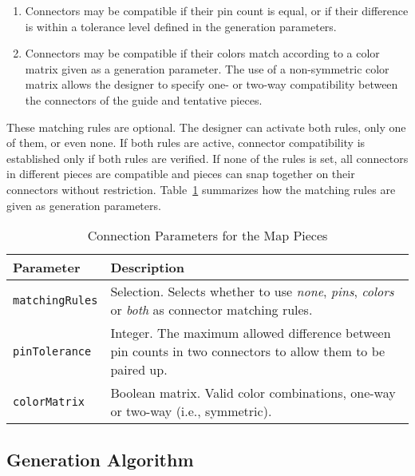 \documentclass[journal]{IEEEtran}
\begin{document}
\begin{enumerate}
    \item Connectors may be compatible if their pin count is equal, or if their
        difference is within a tolerance level defined in the generation parameters.
    \item Connectors may be compatible if their colors match according to a color
        matrix given as a generation parameter. The use of a non-symmetric
        color matrix allows the designer to specify one- or two-way compatibility
        between the connectors of the guide and tentative pieces.
\end{enumerate}

These matching rules are optional. The designer can activate both rules, only
one of them, or even none. If both rules are active, connector compatibility is
established only if both rules are verified. If none of the rules is set, all
connectors in different pieces are compatible and pieces can snap together on
their connectors without restriction. Table~\ref{tab:connparams} summarizes
how the matching rules are given as generation parameters.

\begin{table}[!t]
  \caption{Connection Parameters for the Map Pieces}
  \label{tab:connparams}
  \begin{tabular}{p{1.65cm}p{6.35cm}}
  \toprule
    Parameter & Description \\
  \midrule
    \texttt{matchingRules}
    & Selection. Selects whether to use \textit{none}, \textit{pins}, \textit{colors}
      or \textit{both} as connector matching rules. \\
    \texttt{pinTolerance}
    & Integer. The maximum allowed difference between pin counts in
      two connectors to allow them to be paired up.\\
    \texttt{colorMatrix} & Boolean matrix. Valid color combinations, one-way or
      two-way (i.e., symmetric).\\
  \bottomrule
  \end{tabular}
\end{table}

\subsection{Generation Algorithm}
\label{sec:methods:algorithm}
\end{document}
